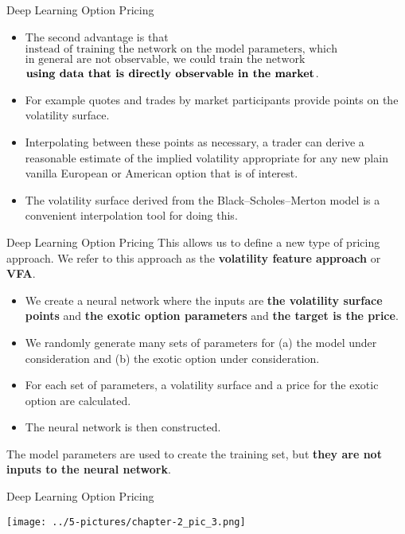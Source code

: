 \documentclass[11pt]{beamer}
\newcommand{\highlight}[1]{%
  \colorbox{yellow!50}{$\displaystyle#1$}}
\begin{document}
\begin{frame}{Deep Learning Option Pricing}
	\begin{itemize}
		\item The second advantage is that \highlight{\text{instead of training the network on the model parameters, which}} \highlight{\text{in general are not observable, we could train the network}} \highlight{\text{\textbf{using data that is directly observable in the market}}}. 
		\item For example quotes and trades by market participants provide points on the
volatility surface. 
\item Interpolating between these points as necessary, a trader can derive a reasonable
estimate of the implied volatility appropriate for any new plain vanilla European or American option that is of interest. 
\item The volatility surface derived from the Black–Scholes–Merton model is a convenient interpolation tool for doing this.

	\end{itemize}
\end{frame}
\begin{frame}{Deep Learning Option Pricing}
This allows us to define a new type of pricing approach. We refer to this approach as the \textbf{volatility feature approach} or \textbf{VFA}.
	\begin{itemize}
		\item We create a neural
network where the inputs are \textbf{the volatility surface points} and \textbf{the exotic option parameters} and \textbf{the
target is the price}. 
\item We randomly generate many sets of parameters for (a) the model under
consideration and (b) the exotic option under consideration. 
\item For each set of parameters, a volatility
surface and a price for the exotic option are calculated. 
\item The neural network is then constructed.
	\end{itemize}
The model parameters are used to create the training set, but \textbf{they are not inputs to the neural network}.
\end{frame}
\begin{frame}{Deep Learning Option Pricing}
\begin{center}
\texttt{[image: ../5-pictures/chapter-2\_pic\_3.png]} 
\end{center}
\end{frame}
\end{document}
